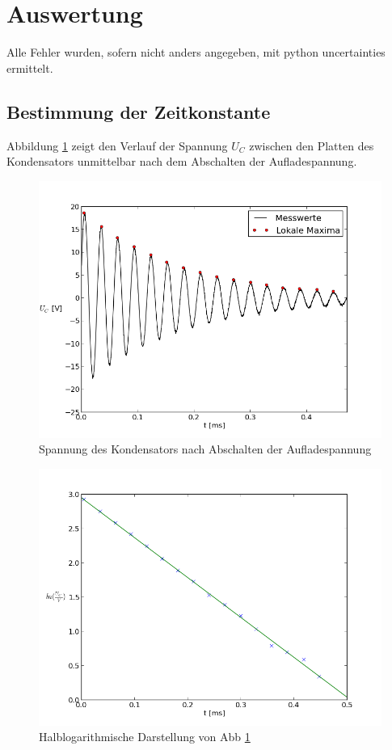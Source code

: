 \documentclass[11pt,ngerman,a4paper]{article}
\begin{document}
\section{Auswertung}
Alle Fehler wurden, sofern nicht anders angegeben, mit python uncertainties ermittelt.
\subsection{Bestimmung der Zeitkonstante}
Abbildung \ref{abb1} zeigt den Verlauf der Spannung $U_C$ zwischen den Platten des Kondensators unmittelbar nach dem Abschalten der Aufladespannung.
\begin{figure}[h!]
\centering
\includegraphics[scale=0.7]{Abb/abb1.png}
\caption{Spannung des Kondensators nach Abschalten der Aufladespannung}
\label{abb1}
\end{figure}
\begin{figure}[h!]
\centering
\includegraphics[scale=0.7]{Abb/abb2.png}
\caption{Halblogarithmische Darstellung von Abb \ref{abb1}}
\label{abb2}
\end{figure}
\end{document}
